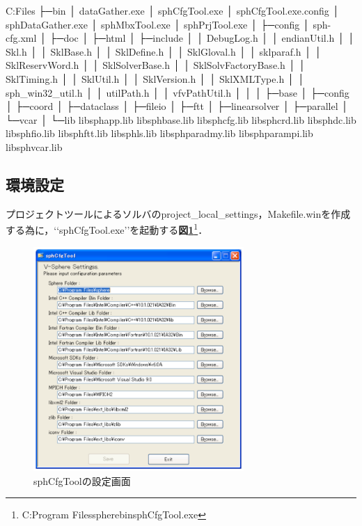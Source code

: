 \begin{program}
C:\Program Files\sphere
├─bin
│      dataGather.exe
│      sphCfgTool.exe
│      sphCfgTool.exe.config
│      sphDataGather.exe
│      sphMbxTool.exe
│      sphPrjTool.exe
│      
├─config
│      sph-cfg.xml
│      
├─doc
│      
├─html
│      
├─include
│  │  DebugLog.h
│  │  endianUtil.h
│  │  Skl.h
│  │  SklBase.h
│  │  SklDefine.h
│  │  SklGloval.h
│  │  sklparaf.h
│  │  SklReservWord.h
│  │  SklSolverBase.h
│  │  SklSolvFactoryBase.h
│  │  SklTiming.h
│  │  SklUtil.h
│  │  SklVersion.h
│  │  SklXMLType.h
│  │  sph_win32_util.h
│  │  utilPath.h
│  │  vfvPathUtil.h
│  │  
│  ├─base
│  ├─config
│  ├─coord
│  ├─dataclass
│  ├─fileio
│  ├─ftt
│  ├─linearsolver
│  ├─parallel
│  └─vcar
│          
└─lib
        libsphapp.lib
        libsphbase.lib
        libsphcfg.lib
        libsphcrd.lib
        libsphdc.lib
        libsphfio.lib
        libsphftt.lib
        libsphls.lib
        libsphparadmy.lib
        libsphparampi.lib
        libsphvcar.lib

\end{program}

%
\subsection{環境設定}
プロジェクトツールによるソルバのproject\_local\_settings，Makefile.winを作成する為に，\lq\lq sphCfgTool.exe\rq\rq を起動する\textbf{図\ref{fig:sphCfgTool setting}}\footnote{C:{\yen}Program Files{\yen}sphere{\yen}bin{\yen}sphCfgTool.exe}．

\begin{figure}[htbp]
\begin{center}
\includegraphics[width=8cm,clip]{sphCfgTool.eps}
\end{center}
\caption{sphCfgToolの設定画面}
\label{fig:sphCfgTool setting}
\end{figure}

